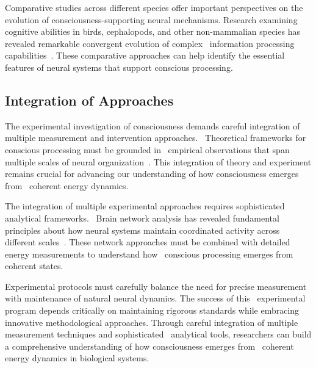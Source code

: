 Comparative studies across different species offer important perspectives on the evolution of consciousness-supporting neural mechanisms. Research examining cognitive abilities in birds, cephalopods, and other non-mammalian species has revealed remarkable convergent evolution of complex~ information processing capabilities~\cite{Clayton2015, Gunturkun2016}. These comparative approaches can help identify the essential features of neural systems that support conscious processing.

\subsection*{Integration of Approaches}

The experimental investigation of consciousness demands careful integration of multiple measurement and intervention approaches.~ Theoretical frameworks for~ conscious processing must be grounded in~ empirical observations that span multiple scales of neural organization~\cite{Dehaene2011, Northoff2020}. This integration of theory and experiment remains crucial for advancing our understanding of how consciousness emerges from~ coherent energy dynamics.

The integration of multiple experimental approaches requires sophisticated~ analytical frameworks.~ Brain network analysis has revealed fundamental principles about how neural systems maintain coordinated activity across different scales~\cite{Bassett2017}. These network approaches must be combined with detailed~ energy measurements to understand how~ conscious processing emerges from~ coherent states.

 Experimental protocols must carefully balance the need for precise measurement with maintenance of natural neural dynamics. The success of this~ experimental program depends critically on maintaining rigorous standards while embracing innovative methodological approaches. Through careful integration of multiple measurement techniques and sophisticated~ analytical tools, researchers can build a comprehensive understanding of how consciousness emerges from~ coherent energy dynamics in biological systems.


